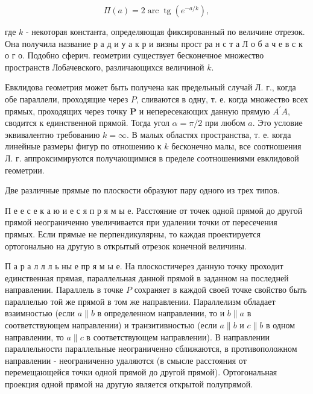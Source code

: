 \documentclass[10pt]{article}
\begin{document}
\[

\Pi(a)=2 \operatorname{arc} \operatorname{tg}\left(e^{-a / k}\right),

\]



где $k$ - некоторая константа, определяющая фиксированный по величине отрезок. Она получила название р а д и у а к р и визны прост ра н с т а Л о б а ч е в с к о г о. Подобно сферич. геометрии существует бесконечное множество пространств Лобачевского, различающихся величиной $k$.



Евклидова геометрия может быть получена как предельный случай Л. г., когда обе параллели, проходящие через $P$, сливаются в одну, т. е. когда множество всех прямых, проходящих через точку $\boldsymbol{P}$ и непересекающих данную прямую $A^{\prime} A$, сводится к единственной прямой. Тогда угол $\alpha=\pi / 2$ при любом $a$. Это условие эквивалентно требованию $k=\infty$. В малых областях пространства, т. е. когда линейные размеры фигур по отношению к $k$ бесконечно малы, все соотношения Л. г. аппроксимируются получающимися в пределе соотношениями евклидовой геометрии.



Две различные прямые по плоскости образуют пару одного из трех типов.



П е е с е к а ю и е с я п р я м ы е. Расстояние от точек одной прямой до другой прямой неограниченно увеличивается при удалении точки от пересечения прямых. Если прямые не перпендикулярны, то каждая проектируется ортогонально на другую в открытый отрезок конечной величины.



П а р а л л л ь ны е пр я м ы е. На плоскостичерез данную точку проходит единственная прямая, параллельная данной прямой в заданном на последней направлении. Параллель в точке $P$ сохраняет в каждой своей точке свойство быть параллелью той же прямой в том же направлении. Параллелизм обладает взаимностью (если $a \| b$ в определенном направлении, то и $b \| a$ в соответствующем направлении) и транзитивностью (если $a \| b$ и $c \| b$ в одном направлении, то $a \| c$ в соответствующем направлении). В направлении параллельности параллельные неограниченно сближаются, в противоположном направлении - неограниченно удаляются (в смысле расстояния от перемещающейся точки одной прямой до другой прямой). Ортогональная проекция одной прямой на другую является открытой полупрямой.
\end{document}
